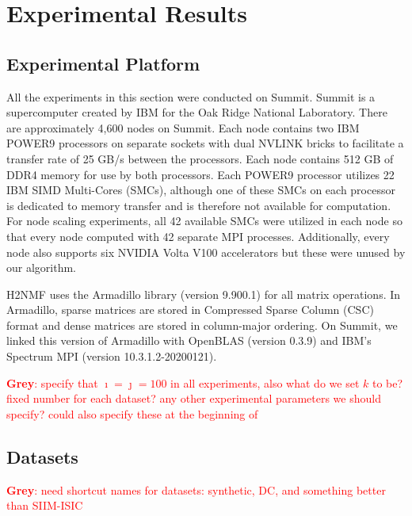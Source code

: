 \documentclass[conference,compsoc]{IEEEtran}
\newcommand{\GB}[1]{\textcolor{red}{\textbf{Grey}: #1}}
\newcommand{\image}{SIIM-ISIC}
\begin{document}
\section{Experimental Results}

\subsection{Experimental Platform}
All the experiments in this section were conducted on Summit. Summit is a supercomputer created by IBM for the Oak Ridge National Laboratory. 
There are approximately 4,600 nodes on Summit. Each node contains two IBM POWER9 processors on separate sockets with dual NVLINK bricks to facilitate a transfer rate of 
25 GB/s between the processors. Each node contains 512 GB of DDR4 memory for use by both processors. Each POWER9 processor utilizes 22 IBM SIMD Multi-Cores (SMCs), 
although one of these SMCs on each processor is dedicated to memory transfer and is therefore not available for computation. 
For node scaling experiments, all 42 available SMCs were utilized in each node so that every node computed with 42 separate MPI processes.
Additionally, every node also supports six NVIDIA Volta V100 accelerators but these were unused by our algorithm. 

H2NMF uses the Armadillo library (version 9.900.1) for all matrix operations. 
In Armadillo, sparse matrices are stored in Compressed Sparse Column (CSC) format and dense matrices are stored in column-major ordering.
On Summit, we linked this version of Armadillo with OpenBLAS (version 0.3.9) and IBM's Spectrum MPI (version 10.3.1.2-20200121).


\GB{specify that $\imath=\jmath=100$ in all experiments, also what do we set $k$ to be?  fixed number for each dataset?  any other experimental parameters we should specify? could also specify these at the beginning of \Cref{sec:perf}}


\subsection{Datasets}

\GB{need shortcut names for datasets: synthetic, DC, and something better than \image{}}
\end{document}
